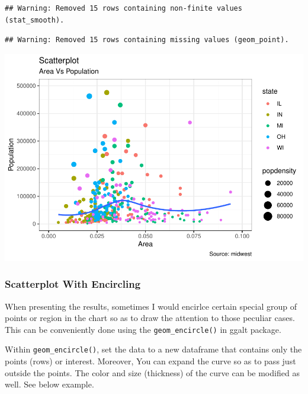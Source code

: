 \documentclass[a4paper]{article}
\begin{document}
\begin{verbatim}
## Warning: Removed 15 rows containing non-finite values (stat_smooth).
\end{verbatim}

\begin{verbatim}
## Warning: Removed 15 rows containing missing values (geom_point).
\end{verbatim}

\includegraphics{M24-ggplot2_Gallery_files/figure-latex/unnamed-chunk-1-1.pdf}
\newpage

\subsubsection{Scatterplot With
Encircling}\label{scatterplot-with-encircling}

When presenting the results, sometimes I would encirlce certain special
group of points or region in the chart so as to draw the attention to
those peculiar cases. This can be conveniently done using the
\texttt{geom\_encircle()} in ggalt package.

Within \texttt{geom\_encircle()}, set the data to a new dataframe that
contains only the points (rows) or interest. Moreover, You can expand
the curve so as to pass just outside the points. The color and size
(thickness) of the curve can be modified as well. See below example.
\end{document}
